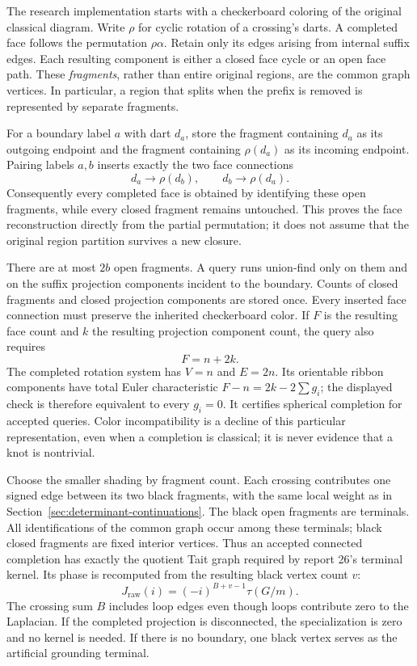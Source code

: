 The research implementation 
starts with a checkerboard coloring of the original classical diagram.
Write $\rho$ for cyclic rotation of a crossing's darts.  A completed face
follows the permutation $\rho\alpha$.  Retain only its edges arising from
internal suffix edges.  Each resulting component is either a closed face
cycle or an open face path.  These \emph{fragments}, rather than entire
original regions, are the common graph vertices.  In particular, a region
that splits when the prefix is removed is represented by separate fragments.

For a boundary label $a$ with dart $d_a$, store the fragment containing
$d_a$ as its outgoing endpoint and the fragment containing $\rho(d_a)$ as
its incoming endpoint.  Pairing labels $a,b$ inserts exactly the two face
connections
\[
 d_a\longrightarrow\rho(d_b),\qquad
 d_b\longrightarrow\rho(d_a).
\]
Consequently every completed face is obtained by identifying these open
fragments, while every closed fragment remains untouched.  This proves the
face reconstruction directly from the partial permutation; it does not
assume that the original region partition survives a new closure.

There are at most $2b$ open fragments.  A query runs union-find only on them
and on the suffix projection components incident to the boundary.  Counts
of closed fragments and closed projection components are stored once.
Every inserted face connection must preserve the inherited checkerboard
color.  If $F$ is the resulting face count and $k$ the resulting projection
component count, the query also requires
\[
 F=n+2k.
\]
The completed rotation system has $V=n$ and $E=2n$.  Its orientable ribbon
components have total Euler characteristic $F-n=2k-2\sum g_i$; the displayed
check is therefore equivalent to every $g_i=0$.  It certifies spherical
completion for accepted queries.  Color incompatibility is a decline of
this particular representation, even when a completion is classical;
it is never evidence that a knot is nontrivial.

Choose the smaller shading by fragment count.  Each crossing contributes
one signed edge between its two black fragments, with the same local weight
as in Section~\ref{sec:determinant-continuations}.  The black open fragments
are terminals.  All identifications of the common graph occur among these
terminals; black closed fragments are fixed interior vertices.  Thus an
accepted connected completion has exactly the quotient Tait graph required
by report 26's terminal kernel.  Its phase is recomputed from the resulting
black vertex count $v$:
\[
 J_{\mathrm{raw}}(i)=(-i)^{B+v-1}\tau(G/m).
\]
The crossing sum $B$ includes loop edges even though loops contribute zero
to the Laplacian.  If the completed projection is disconnected, the
specialization is zero and no kernel is needed.  If there is no boundary,
one black vertex serves as the artificial grounding terminal.

